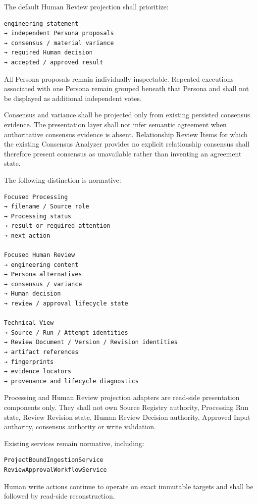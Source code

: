 The default Human Review projection shall prioritize:

\begin{verbatim}
engineering statement
→ independent Persona proposals
→ consensus / material variance
→ required Human decision
→ accepted / approved result
\end{verbatim}

All Persona proposals remain individually inspectable. Repeated executions associated with one Persona remain grouped beneath that Persona and shall not be displayed as additional independent votes.

Consensus and variance shall be projected only from existing persisted consensus evidence. The presentation layer shall not infer semantic agreement when authoritative consensus evidence is absent. Relationship Review Items for which the existing Consensus Analyzer provides no explicit relationship consensus shall therefore present consensus as unavailable rather than inventing an agreement state.

The following distinction is normative:

\begin{verbatim}
Focused Processing
→ filename / Source role
→ Processing status
→ result or required attention
→ next action

Focused Human Review
→ engineering content
→ Persona alternatives
→ consensus / variance
→ Human decision
→ review / approval lifecycle state

Technical View
→ Source / Run / Attempt identities
→ Review Document / Version / Revision identities
→ artifact references
→ fingerprints
→ evidence locators
→ provenance and lifecycle diagnostics
\end{verbatim}

Processing and Human Review projection adapters are read-side presentation components only. They shall not own Source Registry authority, Processing Run state, Review Revision state, Human Review Decision authority, Approved Input authority, consensus authority or write validation.

Existing services remain normative, including:

\begin{verbatim}
ProjectBoundIngestionService
ReviewApprovalWorkflowService
\end{verbatim}

Human write actions continue to operate on exact immutable targets and shall be followed by read-side reconstruction.

